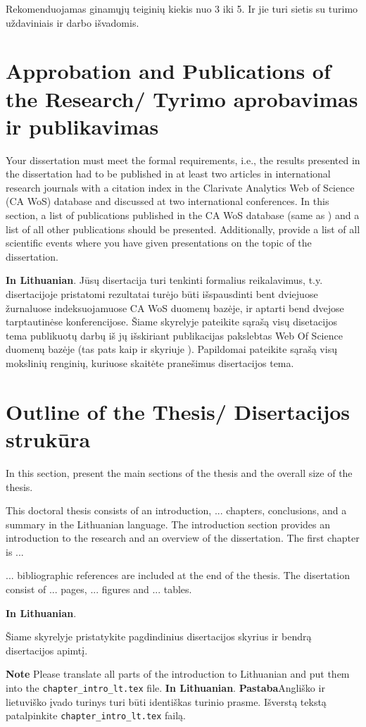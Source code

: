 Rekomenduojamas ginamųjų teiginių kiekis nuo  3 iki 5. Ir jie turi sietis su turimo uždaviniais ir darbo išvadomis.


\section*{Approbation and Publications of the Research/ Tyrimo aprobavimas ir publikavimas} %

Your dissertation must meet the formal requirements, i.e., the results presented in the dissertation had to be published in at least two articles in international research journals with a citation index in the Clarivate Analytics Web of Science (CA WoS) database and discussed at two international conferences.
In this section, a list of publications published in the CA WoS database (same as ) and a list of all other publications should be presented. Additionally, provide a list of all scientific events where you have given presentations on the topic of the dissertation.

\textbf{In Lithuanian}. 
Jūsų disertacija turi tenkinti formalius reikalavimus, t.y. disertacijoje pristatomi rezultatai turėjo būti išspausdinti bent dviejuose žurnaluose indeksuojamuose CA WoS duomenų bazėje, ir aptarti bend dvejose tarptautinėse konferencijose.
Šiame skyrelyje pateikite sąrašą visų disetacijos tema publikuotų darbų iš jų išskiriant publikacijas pakslebtas Web Of Science duomenų bazėje (tas pats kaip ir skyriuje ). Papildomai pateikite sąrašą visų mokslinių renginių, kuriuose skaitėte pranešimus disertacijos tema.


\section*{Outline of the Thesis/ Disertacijos strukūra}

In this section, present the main sections of the thesis and the overall size of the thesis.

This doctoral thesis consists of an introduction, ... chapters, conclusions, and a summary in the Lithuanian language. The introduction section provides an introduction to the research and an overview of the dissertation. The first chapter is ...

... bibliographic references are included at the end of the thesis. The disertation consist of ... pages, ... figures and ... tables.


\textbf{In Lithuanian}. 

Šiame skyrelyje pristatykite pagdindinius disertacijos skyrius ir bendrą disertacijos apimtį.



\textbf{Note} Please translate all parts of the introduction to Lithuanian and put them into the \verb|chapter_intro_lt.tex| file.
\textbf{In Lithuanian}. \textbf{Pastaba}Angliško ir lietuviško įvado turinys turi būti identiškas turinio prasme. Išverstą tekstą patalpinkite \verb|chapter_intro_lt.tex| failą.